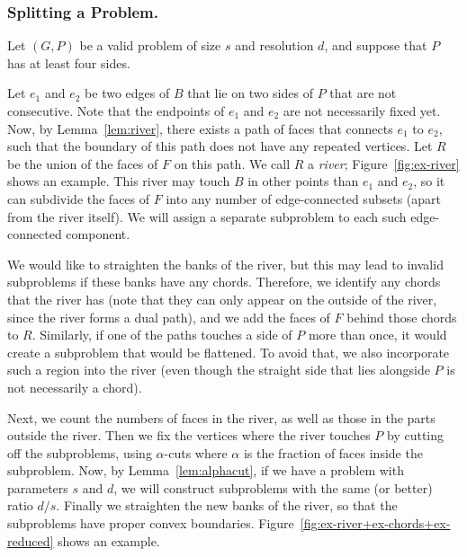 \documentclass[11pt]{article}
\renewcommand{\subsection}[1]{\subsubsection{#1.}}
\begin{document}
  \subsection {Splitting a Problem} \label {sec:split}

    Let $(G, P)$ be a valid problem of size $s$ and resolution $d$,
    and suppose that $P$ has at least four sides.

    Let $e_1$ and $e_2$ be two edges of $B$ that lie on two sides of $P$ that
    are not consecutive. Note that the endpoints of $e_1$ and $e_2$ are not
    necessarily fixed yet.
    Now, by Lemma~\ref {lem:river}, there exists a path of faces
    that connects $e_1$ to $e_2$, such that the boundary of this path does not
    have any repeated vertices. Let $R$ be the union of the faces of $F$ on
    this path. We call $R$ a \emph {river}; Figure~\ref {fig:ex-river} shows
    an example.
    This river may touch $B$ in other points than $e_1$ and $e_2$, so it can
    subdivide the faces of $F$ into any number of edge-connected subsets
    (apart from the river itself). We will assign a separate subproblem to
    each such edge-connected component.

    We would like to straighten the banks of the river, but this may lead to
    invalid subproblems if these banks have any chords. Therefore, we identify
    any chords that the river has
    (note that they can only appear on the outside of the river, since the river forms a dual path),
    and we add the faces of $F$ behind those chords to $R$.
    Similarly,
    if one of the paths touches a side of $P$ more than once, it would create a
    subproblem that would be flattened. To avoid that, we also incorporate such a
    region into the river (even though the straight side that lies alongside $P$
    is not necessarily a chord).

    Next, we count the numbers of faces in the river, as well as those
    in the parts outside the river. Then we fix the vertices where the river
    touches $P$ by cutting off the subproblems, using $\alpha$-cuts where $\alpha$
    is the fraction of faces inside the subproblem.
    Now, by Lemma~\ref {lem:alphacut},
    if we have a problem with parameters $s$ and $d$, we will
    construct subproblems with the same (or better) ratio $d/s$.
    Finally we straighten the new
    banks of the river, so that the subproblems have proper
    convex boundaries. Figure~\ref {fig:ex-river+ex-chords+ex-reduced} shows
    an example.
\end{document}
